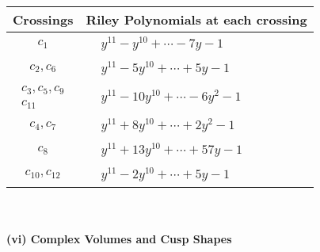 \documentclass[1p]{elsarticle_modified}
\theoremstyle{definition}
\begin{document}
\begin{tabular}{m{50pt}|m{274pt}}
Crossings & \hspace{64pt}Riley Polynomials at each crossing \\
\hline $$\begin{aligned}c_{1}\end{aligned}$$&$\begin{aligned}
&y^{11}- y^{10}+\cdots-7 y-1
\end{aligned}$\\
\hline $$\begin{aligned}c_{2},c_{6}\end{aligned}$$&$\begin{aligned}
&y^{11}-5 y^{10}+\cdots+5 y-1
\end{aligned}$\\
\hline $$\begin{aligned}c_{3},c_{5},c_{9}\\c_{11}\end{aligned}$$&$\begin{aligned}
&y^{11}-10 y^{10}+\cdots-6 y^2-1
\end{aligned}$\\
\hline $$\begin{aligned}c_{4},c_{7}\end{aligned}$$&$\begin{aligned}
&y^{11}+8 y^{10}+\cdots+2 y^2-1
\end{aligned}$\\
\hline $$\begin{aligned}c_{8}\end{aligned}$$&$\begin{aligned}
&y^{11}+13 y^{10}+\cdots+57 y-1
\end{aligned}$\\
\hline $$\begin{aligned}c_{10},c_{12}\end{aligned}$$&$\begin{aligned}
&y^{11}-2 y^{10}+\cdots+5 y-1
\end{aligned}$\\
\hline
\end{tabular}\\~\\
\newpage\flushleft \textbf{(vi) Complex Volumes and Cusp Shapes}
\end{document}
